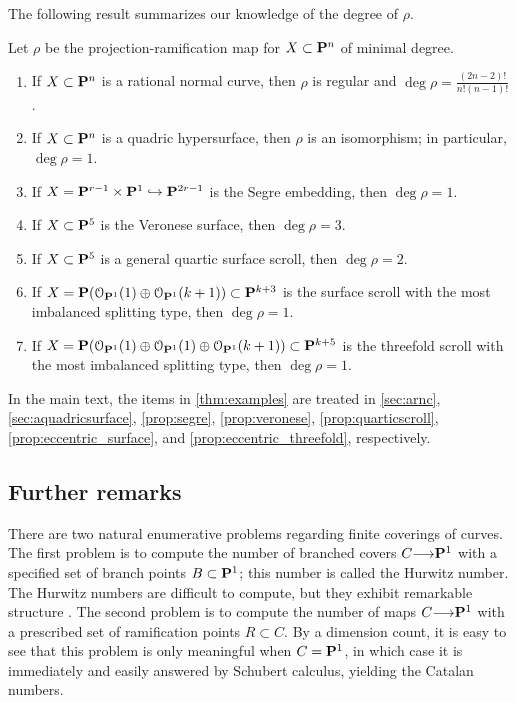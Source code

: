\documentclass[11pt,reqno]{amsart}
\theoremstyle{plain}
\theoremstyle{definition}
\theoremstyle{remark}
\numberwithin{equation}{section}
\renewcommand{\to}{{\longrightarrow}}
\numberwithin{equation}{section}
\renewcommand{\O}{\mathcal O}
\begin{document}
The following result summarizes our knowledge of the degree of $\rho$.
\begin{maintheorem}\label{thm:examples}
  Let $\rho$ be the projection-ramification map for $X \subset \P^n$ of minimal degree.
\begin{enumerate}
  \item If $X \subset \P^{n}$ is a rational normal curve, then $\rho$ is regular and $\deg \rho = \frac{(2n-2)!}{n!(n-1)!}$.
  \item  If $X \subset \P^{n}$ is a quadric hypersurface, then $\rho$ is an isomorphism; in particular, $\deg \rho = 1$.

  \item  If  $X = \P^{r-1} \times \P^{1} \hookrightarrow \P^{2r-1}$ is the Segre embedding, then $\deg \rho = 1$.

  \item  If $X \subset \P^{5}$ is the Veronese surface, then $ \deg \rho = 3$.
  \item If $X \subset \P^{5}$ is a general quartic surface scroll, then $\deg \rho = 2$.
  \item If $X = \P(\O_{\P^{1}}(1) \oplus \O_{\P^{1}}(k+1)) \subset \P^{k+3}$ is the surface scroll with the most imbalanced splitting type, then $\deg \rho = 1$.
  \item If $X = \P(\O_{\P^{1}}(1) \oplus \O_{\P^{1}}(1) \oplus \O_{\P^{1}}(k+1)) \subset \P^{k+5}$ is the threefold scroll with the most imbalanced splitting type, then $\deg \rho = 1$.
\end{enumerate} 
\end{maintheorem}
In the main text, the items in \autoref{thm:examples} are treated in \autoref{sec:arnc}, \autoref{sec:aquadricsurface}, \autoref{prop:segre}, \autoref{prop:veronese}, \autoref{prop:quarticscroll}, \autoref{prop:eccentric_surface}, and \autoref{prop:eccentric_threefold}, respectively.

\subsection{Further remarks}
There are two natural enumerative problems regarding finite coverings of curves.
The first problem is to compute the number of branched covers $C \to \P^1$ with a specified set of branch points $B \subset \P^1$; this number is called the Hurwitz number.
The Hurwitz numbers are difficult to compute, but they exhibit remarkable structure \cite{eke.lan.sha.ea:99,eke.lan.sha.ea:01}.
The second problem is to compute the number of maps $C \to \P^1$ with a prescribed set of ramification points $R \subset C$.
By a dimension count, it is easy to see that this problem is only meaningful when $C = \P^{1}$, in which case it is immediately and easily answered by Schubert calculus, yielding the Catalan numbers.
\end{document}
